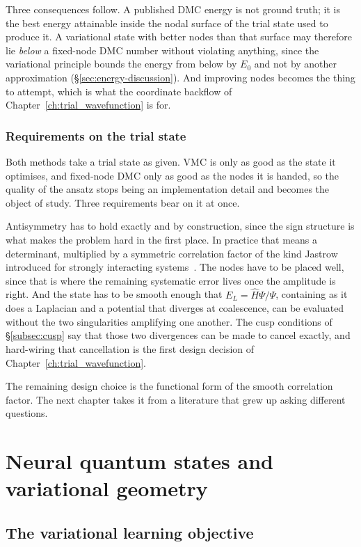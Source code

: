 Three consequences follow. A published DMC energy is not ground truth; it is the best
energy attainable inside the nodal surface of the trial state used to produce it. A variational state
with better nodes than that surface may therefore lie \emph{below} a fixed-node DMC number
without violating anything, since the variational principle bounds the energy from below by
$E_0$ and not by another approximation (\S\ref{sec:energy-discussion}). And improving nodes
becomes the thing to attempt, which is what the coordinate backflow of
Chapter~\ref{ch:trial_wavefunction} is for.

\subsection{Requirements on the trial state}

Both methods take a trial state as given. VMC is only as good as the state it optimises,
and fixed-node DMC only as good as the nodes it is handed, so the quality of the ansatz
stops being an implementation detail and becomes the object of study. Three requirements
bear on it at once.

Antisymmetry has to hold exactly and by construction, since the sign structure is what
makes the problem hard in the first place. In practice that means a determinant, multiplied
by a symmetric correlation factor of the kind Jastrow introduced for strongly interacting
systems~\cite{Jastrow1955-ManyBodyCorrelation}. The nodes have to be placed well, since
that is where the remaining systematic error lives once the amplitude is right. And the
state has to be smooth enough that $E_L=\hat H\Psi/\Psi$, containing as it does a Laplacian
and a potential that diverges at coalescence, can be evaluated without the two
singularities amplifying one another. The cusp conditions of \S\ref{subsec:cusp} say that
those two divergences can be made to cancel exactly, and hard-wiring that cancellation is
the first design decision of Chapter~\ref{ch:trial_wavefunction}.

The remaining design choice is the functional form of the smooth correlation factor. The
next chapter takes it from a literature that grew up asking different questions.

\chapter{Neural quantum states and variational geometry}
\label{ch:ml_theory}

\section{The variational learning objective}
\label{sec:ml-setup}

